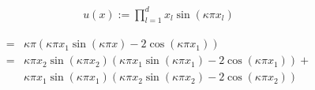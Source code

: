 \documentclass[refman]{article}
\theoremstyle{definition}
\begin{document}
\begin{align*}
	u(x) := \prod_{l=1}^d x_l \sin (\kappa \pi x_l)
\end{align*}

\begin{align*}
	=& \kappa \pi \left( \kappa \pi x_1 \sin ( \kappa \pi x ) - 2 \cos( \kappa \pi x_1) \right) \\
	=& \kappa \pi x_2 \sin( \kappa \pi x_2) \left(  \kappa \pi x_1 \sin(\kappa \pi x_1) - 2 \cos ( \kappa \pi x_1) \right) + \\ 
	& \kappa \pi x_1 \sin( \kappa \pi x_1) \left(  \kappa \pi x_2 \sin(\kappa \pi x_2) - 2 \cos ( \kappa \pi x_2) \right)
\end{align*}
\end{document}
